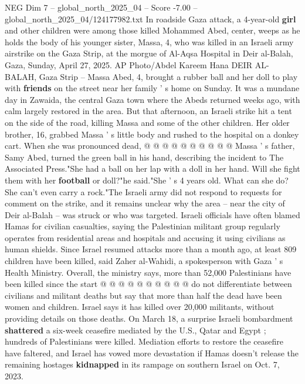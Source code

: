 \begin{textsample}{NEG Dim 7 – global\_north\_2025\_04 – Score -7.00 – global\_north\_2025\_04/124177982.txt}  \label{ex:f7_neg_094}
In roadside Gaza attack, a 4-year-old \textbf{girl} and other children were among those killed Mohammed Abed, center, weeps as he holds the body of his younger sister, Massa, 4, who was killed in an Israeli army airstrike on the Gaza Strip, at the morgue of Al-Aqsa Hospital in Deir al-Balah, Gaza, Sunday, April 27, 2025.
AP Photo/Abdel Kareem Hana DEIR AL-BALAH, Gaza Strip -- Massa Abed, 4, brought a rubber ball and her doll to play with \textbf{friends} on the street near her family ' s home on Sunday.
It was a mundane day in Zawaida, the central Gaza town where the Abeds returned weeks ago, with calm largely restored in the area.
But that afternoon, an Israeli strike hit a tent on the side of the road, killing Massa and some of the other children.
Her older brother, 16, grabbed Massa ' s little body and rushed to the hospital on a donkey cart.
When she was pronounced dead, @ @ @ @ @ @ @ @ @ @ Massa ' s father, Samy Abed, turned the green ball in his hand, describing the incident to The Associated Press."She had a ball on her lap with a doll in her hand.
Will she fight them with her \textbf{football} or doll?"he said."She ' s 4 years old.
What can she do?
She can't even carry a rock."The Israeli army did not respond to requests for comment on the strike, and it remains unclear why the area -- near the city of Deir al-Balah -- was struck or who was targeted.
Israeli officials have often blamed Hamas for civilian casualties, saying the Palestinian militant group regularly operates from residential areas and hospitals and accusing it using civilians as human shields.
Since Israel resumed attacks more than a month ago, at least 809 children have been killed, said Zaher al-Wahidi, a spokesperson with Gaza ' s Health Ministry.
Overall, the ministry says, more than 52,000 Palestinians have been killed since the start @ @ @ @ @ @ @ @ @ @ do not differentiate between civilians and militant deaths but say that more than half the dead have been women and children.
Israel says it has killed over 20,000 militants, without providing details on those deaths.
On March 18, a surprise Israeli bombardment \textbf{shattered} a six-week ceasefire mediated by the U.S., Qatar and Egypt ; hundreds of Palestinians were killed.
Mediation efforts to restore the ceasefire have faltered, and Israel has vowed more devastation if Hamas doesn't release the remaining hostages \textbf{kidnapped} in its rampage on southern Israel on Oct. 7, 2023.

\end{textsample}
